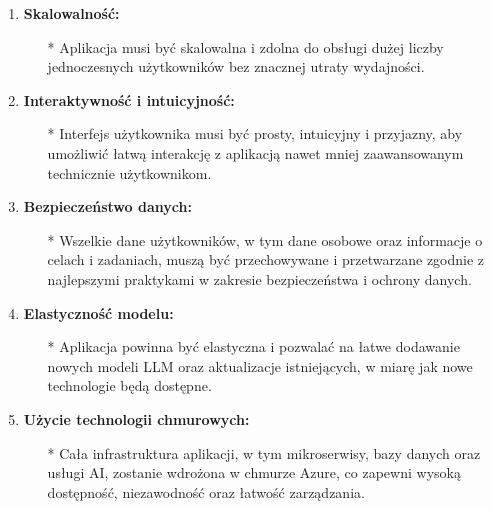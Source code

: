 \begin{enumerate}
    \item {\bf Skalowalność:}
        \begin{itemize}
            \item[*] Aplikacja musi być skalowalna i zdolna do obsługi dużej liczby jednoczesnych użytkowników bez znacznej utraty wydajności.
       \end{itemize}
    
    \item {\bf Interaktywność i intuicyjność:}
        \begin{itemize}
            \item[*] Interfejs użytkownika musi być prosty, intuicyjny i przyjazny, aby umożliwić łatwą interakcję z aplikacją nawet mniej zaawansowanym technicznie użytkownikom.
       \end{itemize}
    
    \item {\bf Bezpieczeństwo danych:}
        \begin{itemize}
            \item[*] Wszelkie dane użytkowników, w tym dane osobowe oraz informacje o celach i zadaniach, muszą być przechowywane i przetwarzane zgodnie z najlepszymi praktykami w zakresie bezpieczeństwa i ochrony danych.
       \end{itemize}
    
    \item {\bf Elastyczność modelu:}
        \begin{itemize}
            \item[*] Aplikacja powinna być elastyczna i pozwalać na łatwe dodawanie nowych modeli LLM oraz aktualizacje istniejących, w miarę jak nowe technologie będą dostępne.
       \end{itemize}
    
    \item {\bf Użycie technologii chmurowych:}
        \begin{itemize}
            \item[*] Cała infrastruktura aplikacji, w tym mikroserwisy, bazy danych oraz usługi AI, zostanie wdrożona w chmurze Azure, co zapewni wysoką dostępność, niezawodność oraz łatwość zarządzania.
       \end{itemize}
\end{enumerate}

